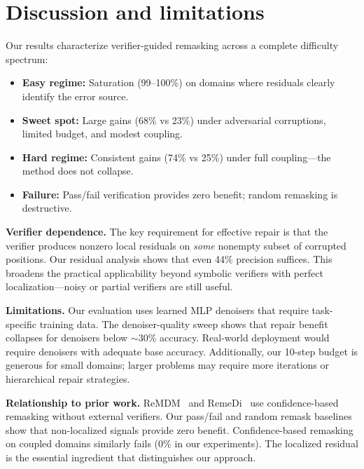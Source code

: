 \documentclass[11pt,a4paper,twoside]{article}
\theoremstyle{definition}
\begin{document}
\section{Discussion and limitations}
\label{sec:discussion}

Our results characterize verifier-guided remasking across a complete difficulty spectrum:

\begin{itemize}[leftmargin=2em]
    \item \textbf{Easy regime:} Saturation (99--100\%) on domains where residuals clearly identify the error source.
    \item \textbf{Sweet spot:} Large gains (68\% vs 23\%) under adversarial corruptions, limited budget, and modest coupling.
    \item \textbf{Hard regime:} Consistent gains (74\% vs 25\%) under full coupling---the method does not collapse.
    \item \textbf{Failure:} Pass/fail verification provides zero benefit; random remasking is destructive.
\end{itemize}

\textbf{Verifier dependence.} The key requirement for effective repair is that the verifier produces nonzero local residuals on \emph{some} nonempty subset of corrupted positions. Our residual analysis shows that even 44\% precision suffices. This broadens the practical applicability beyond symbolic verifiers with perfect localization---noisy or partial verifiers are still useful.

\textbf{Limitations.} Our evaluation uses learned MLP denoisers that require task-specific training data. The denoiser-quality sweep shows that repair benefit collapses for denoisers below $\sim$30\% accuracy. Real-world deployment would require denoisers with adequate base accuracy. Additionally, our 10-step budget is generous for small domains; larger problems may require more iterations or hierarchical repair strategies.

\textbf{Relationship to prior work.} ReMDM~\cite{remdm2025} and RemeDi~\cite{remedi2025} use confidence-based remasking without external verifiers. Our pass/fail and random remask baselines show that non-localized signals provide zero benefit. Confidence-based remasking on coupled domains similarly fails (0\% in our experiments). The localized residual is the essential ingredient that distinguishes our approach.
\end{document}
